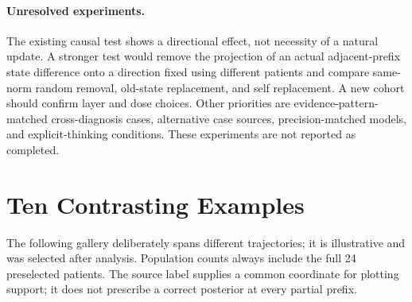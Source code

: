 \paragraph{Unresolved experiments.} The existing causal test shows a directional effect, not necessity of a natural update. A stronger test would remove the projection of an actual adjacent-prefix state difference onto a direction fixed using different patients and compare same-norm random removal, old-state replacement, and self replacement. A new cohort should confirm layer and dose choices. Other priorities are evidence-pattern-matched cross-diagnosis cases, alternative case sources, precision-matched models, and explicit-thinking conditions. These experiments are not reported as completed.

\section{Ten Contrasting Examples}\label{app:examples}
The following gallery deliberately spans different trajectories; it is illustrative and was selected after analysis. Population counts always include the full 24 preselected patients. The source label supplies a common coordinate for plotting support; it does not prescribe a correct posterior at every partial prefix.


